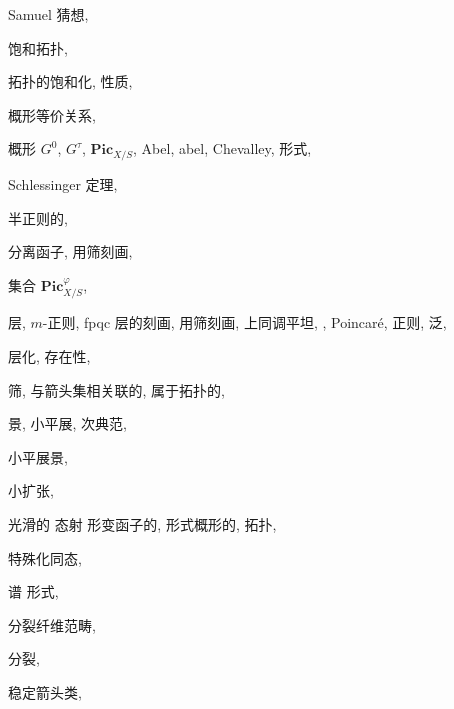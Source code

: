 \begin{theindex}
\indexspace
\item Samuel 猜想, 
\item 饱和拓扑, 
\item 拓扑的饱和化, 
\subitem 性质, 
\item 概形等价关系, 
\item 概形
\subitem $G^0$, 
\subitem $G^\tau$, 
\subitem $\mathbf{Pic}_{X/S}$, 
\subitem Abel, 
\subitem abel, 
\subitem Chevalley, 
\subitem 形式, 
\item Schlessinger 定理, 
\item 半正则的, 
\item 分离函子, 
\subitem 用筛刻画, 
\item 集合
\subitem $\mathbf{Pic}_{X/S}^{\varphi}$, 
\item 层, 
\subitem $m$-正则, 
\subitem fpqc 层的刻画, 
\subitem 用筛刻画, 
\subitem 上同调平坦, , 
\subitem Poincaré, 
\subitem 正则, 
\subitem 泛, 
\item 层化, 
\subitem 存在性, 
\item 筛, 
\subitem 与箭头集相关联的, 
\subitem 属于拓扑的, 
\item 景, 
\subitem 小平展, 
\subitem 次典范, 
\item 小平展景, 
\item 小扩张, 
\item 光滑的
\subitem 态射
\subsubitem 形变函子的, 
\subsubitem 形式概形的, 
\subitem 拓扑, 
\item 特殊化同态, 
\item 谱
\subitem 形式, 
\item 分裂纤维范畴, 
\item 分裂, 
\item 稳定箭头类, 

\end{theindex}
